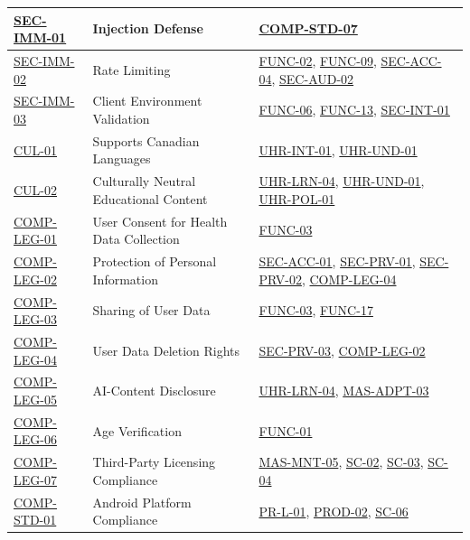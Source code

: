 \documentclass[12pt]{article}
\begin{document}
\begin{xltabular}{\textwidth}{|p{2.3cm}|p{4.2cm}|X|}
\hline
\hyperlink{req:SEC-IMM-01}{SEC-IMM-01} & Injection Defense & \hyperlink{req:COMP-STD-07}{COMP-STD-07} \\
\hline
\hyperlink{req:SEC-IMM-02}{SEC-IMM-02} & Rate Limiting & \hyperlink{req:FUNC-02}{FUNC-02}, \hyperlink{req:FUNC-09}{FUNC-09}, \hyperlink{req:SEC-ACC-04}{SEC-ACC-04}, \hyperlink{req:SEC-AUD-02}{SEC-AUD-02} \\
\hline
\hyperlink{req:SEC-IMM-03}{SEC-IMM-03} & Client Environment Validation & \hyperlink{req:FUNC-06}{FUNC-06}, \hyperlink{req:FUNC-13}{FUNC-13}, \hyperlink{req:SEC-INT-01}{SEC-INT-01} \\
\hline
\hyperlink{req:CUL-01}{CUL-01} & Supports Canadian Languages & \hyperlink{req:UHR-INT-01}{UHR-INT-01}, \hyperlink{req:UHR-UND-01}{UHR-UND-01} \\
\hline
\hyperlink{req:CUL-02}{CUL-02} & Culturally Neutral Educational Content & \hyperlink{req:UHR-LRN-04}{UHR-LRN-04}, \hyperlink{req:UHR-UND-01}{UHR-UND-01}, \hyperlink{req:UHR-POL-01}{UHR-POL-01} \\
\hline
\hyperlink{req:COMP-LEG-01}{COMP-LEG-01} & User Consent for Health Data Collection & \hyperlink{req:FUNC-03}{FUNC-03} \\
\hline
\hyperlink{req:COMP-LEG-02}{COMP-LEG-02} & Protection of Personal Information & \hyperlink{req:SEC-ACC-01}{SEC-ACC-01}, \hyperlink{req:SEC-PRV-01}{SEC-PRV-01}, \hyperlink{req:SEC-PRV-02}{SEC-PRV-02}, \hyperlink{req:COMP-LEG-04}{COMP-LEG-04} \\
\hline
\hyperlink{req:COMP-LEG-03}{COMP-LEG-03} & Sharing of User Data & \hyperlink{req:FUNC-03}{FUNC-03}, \hyperlink{req:FUNC-17}{FUNC-17} \\
\hline
\hyperlink{req:COMP-LEG-04}{COMP-LEG-04} & User Data Deletion Rights & \hyperlink{req:SEC-PRV-03}{SEC-PRV-03}, \hyperlink{req:COMP-LEG-02}{COMP-LEG-02} \\
\hline
\hyperlink{req:COMP-LEG-05}{COMP-LEG-05} & AI-Content Disclosure & \hyperlink{req:UHR-LRN-04}{UHR-LRN-04}, \hyperlink{req:MAS-ADPT-03}{MAS-ADPT-03} \\
\hline
\hyperlink{req:COMP-LEG-06}{COMP-LEG-06} & Age Verification & \hyperlink{req:FUNC-01}{FUNC-01} \\
\hline
\hyperlink{req:COMP-LEG-07}{COMP-LEG-07} & Third-Party Licensing Compliance & \hyperlink{req:MAS-MNT-05}{MAS-MNT-05}, \hyperlink{req:SC-02}{SC-02}, \hyperlink{req:SC-03}{SC-03}, \hyperlink{req:SC-04}{SC-04} \\
\hline
\hyperlink{req:COMP-STD-01}{COMP-STD-01} & Android Platform Compliance & \hyperlink{req:PR-L-01}{PR-L-01}, \hyperlink{req:PROD-02}{PROD-02}, \hyperlink{req:SC-06}{SC-06} \\

\end{xltabular}
\end{document}
